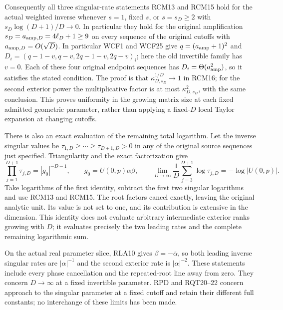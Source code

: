 Consequently all three singular-rate statements RCM13 and RCM15
hold for the actual weighted inverse whenever $s=1$, fixed $s$,
or $s=s_D\ge2$ with $s_D\log(D+1)/D\to0$.
In particular they hold for the original amplification
$s_D=a_{{\rm amp},D}=4\ell_D+1\ge9$ on every sequence of the
original cutoffs with $a_{{\rm amp},D}=O(\sqrt D)$.
In particular WCF1 and WCF25 give $q=(a_{\rm amp}+1)^2$ and
$D_i=(q-1-v,q-v,2q-1-v,2q-v)_i$; here the old invertible
family has $v=0$. Each of these four original endpoint sequences
has $D_i=\Theta(a_{\rm amp}^2)$, so it satisfies the stated condition.
The proof is that $\kappa_{D,s_D}^{1/D}\to1$ in RCM16;
for the second exterior power the multiplicative factor is
at most $\kappa_{D,s_D}^2$, with the same conclusion.
This proves uniformity in the growing matrix size at each fixed
admitted geometric parameter, rather than applying a fixed-$D$
local Taylor expansion at changing cutoffs.

There is also an exact evaluation of the remaining total logarithm.
Let the inverse singular values be $\tau_{1,D}\ge\cdots\ge
\tau_{D+1,D}>0$ in any of the original source sequences just
specified.  Triangularity and the exact factorization give
\[
 \prod_{j=1}^{D+1}\tau_{j,D}=|g_0|^{-D-1},\qquad
 g_0=U(0,p)\alpha\beta,\qquad
 \lim_{D\to\infty}\frac1D\sum_{j=3}^{D+1}\log\tau_{j,D}
             =-\log|U(0,p)|.
 \tag{RCM17}
\]
Take logarithms of the first identity, subtract the first two
singular logarithms and use RCM13 and RCM15.  The root factors
cancel exactly, leaving the original analytic unit.  Its value
is not set to one, and its contribution is extensive in the
dimension.  This identity does not evaluate arbitrary intermediate
exterior ranks growing with $D$; it evaluates precisely the two
leading rates and the complete remaining logarithmic sum.

On the actual real parameter slice, RLA10 gives
$\beta=-\overline\alpha$, so both leading inverse singular
rates are $|\alpha|^{-1}$ and the second exterior rate is
$|\alpha|^{-2}$.  These statements include every phase
cancellation and the repeated-root line away from zero.
They concern $D\to\infty$ at a fixed invertible parameter.
RPD and RQT20--22 concern approach to the singular parameter
at a fixed cutoff and retain their different full constants;
no interchange of these limits has been made.
